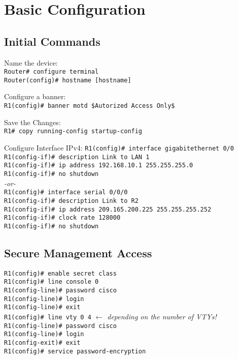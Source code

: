 \section{Basic Configuration}
\subsection{Initial Commands}
Name the device: \\
\verb!Router# configure terminal! \\
\verb!Router(config)# hostname [hostname]! \\

\smallskip

Configure a banner: \\
\verb!R1(config)# banner motd $Autorized Access Only$! \\

\smallskip

Save the Changes: \\
\verb!R1# copy running-config startup-config!

\smallskip

Configure Interface IPv4:
\verb!R1(config)# interface gigabitethernet 0/0! \\
\verb!R1(config-if)# description Link to LAN 1! \\
\verb!R1(config-if)# ip address 192.168.10.1 255.255.255.0! \\
\verb!R1(config-if)# no shutdown! \\
\textit{-or-} \\
\verb!R1(config)# interface serial 0/0/0! \\
\verb!R1(config-if)# description Link to R2! \\
\verb!R1(config-if)# ip address 209.165.200.225 255.255.255.252! \\
\verb!R1(config-if)# clock rate 128000! \\
\verb!R1(config-if)# no shutdown! \\


\subsection{Secure Management Access}
\verb!R1(config)# enable secret class! \\
\verb!R1(config)# line console 0! \\
\verb!R1(config-line)# password cisco! \\
\verb!R1(config-line)# login! \\
\verb!R1(config-line)# exit! \\
\verb!R1(config)# line vty 0 4! \textit{$\leftarrow$ depending on the number of VTYs!} \\
\verb!R1(config-line)# password cisco! \\
\verb!R1(config-line)# login! \\
\verb!R1(config-exit)# exit! \\
\verb!R1(config)# service password-encryption!

